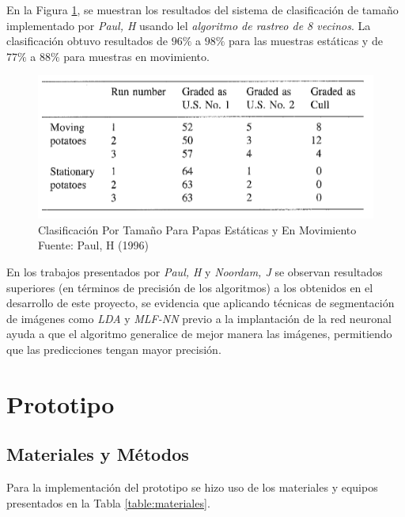 En la Figura \ref{fig:tabPAUL}, se muestran los resultados del sistema de clasificación de tamaño implementado por \textit{Paul, H} usando lel \textit{algoritmo de rastreo de 8 vecinos}. La clasificación obtuvo resultados de $96\%$ a $98\%$ para las muestras estáticas y de $77\%$ a $88\%$ para muestras en movimiento.

\begin{figure}[ht]
	\centering
	\includegraphics[scale=0.7]{Figs/tabPaul.png}
	\caption{Clasificación Por Tamaño Para Papas Estáticas y En Movimiento  \\ Fuente: Paul, H (1996)}
	\label{fig:tabPAUL}
\end{figure}

En los trabajos presentados por \textit{Paul, H} y \textit{Noordam, J} se observan resultados superiores (en términos de precisión de los algoritmos) a los obtenidos en el desarrollo de este proyecto, se evidencia que aplicando técnicas de segmentación de imágenes como \textit{LDA} y \textit{MLF-NN} previo a la implantación de la red neuronal ayuda a que el algoritmo generalice de mejor manera las imágenes, permitiendo que las predicciones tengan mayor precisión.\\


\newpage
\chapter{Prototipo}

\section{Materiales y Métodos}
Para la implementación del prototipo se hizo uso de los materiales y equipos presentados en la Tabla \ref{table:materiales}.

